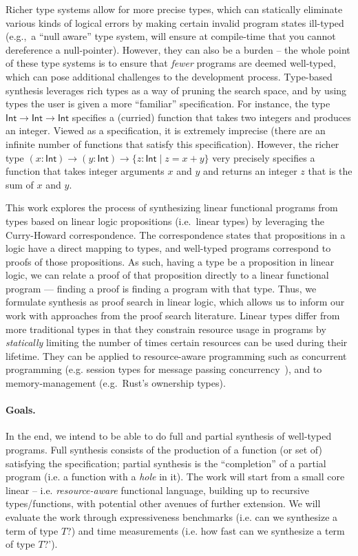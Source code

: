 \documentclass{llncs}
\newcommand{\mypara}[1]{\paragraph{\textbf{#1}.}}
\begin{document}
Richer type systems allow for more precise types, which can
statically eliminate various kinds of logical errors by making certain
invalid program states ill-typed (e.g.,~a ``null aware'' type system,
will ensure at compile-time that you cannot dereference a
null-pointer). However, they can also be a burden -- the whole point
of these type systems is to ensure that \emph{fewer} programs are
deemed well-typed, which can pose additional challenges to the
development process. Type-based synthesis leverages rich types as a
way of pruning the search space, and by using types the user 
is given a more ``familiar'' specification. For instance, the type
$\mathsf{Int} \rightarrow \mathsf{Int} \rightarrow \mathsf{Int}$
specifies a (curried) function that takes two integers and produces an
integer. Viewed as a specification, it is extremely imprecise (there
are an infinite number of functions that satisfy this specification).
However, the richer type $(x{:}\mathsf{Int}) \rightarrow
(y{:}\mathsf{Int}) \rightarrow \{z{:}\mathsf{Int} \mid z = x+y\}$
very precisely specifies a function that takes integer arguments $x$
and $y$ and returns an integer $z$ that is the sum of $x$ and $y$. 

%
This work explores the process of synthesizing linear functional
programs from types based on linear logic propositions (i.e.~linear
types) by leveraging the Curry-Howard correspondence.  The
correspondence states that propositions in a logic have a direct
mapping to types, and well-typed programs correspond to proofs of
those propositions.  As such, having a type be a proposition in linear
logic, we can relate a proof of that proposition directly to a linear
functional program — finding a proof is finding a program with that
type. Thus, we formulate synthesis as proof search in linear logic,
which allows us to inform our work with approaches from the proof
search literature.  Linear types differ from more traditional types in
that they constrain resource usage in programs by \emph{statically}
limiting the number of times certain resources can be used during
their lifetime.  They can be applied to resource-aware programming
such as concurrent programming (e.g. session types for message passing
concurrency~\cite{}), and to memory-management (e.g.~Rust's ownership
types).

\mypara{Goals}
In the end, we intend to be able to do full and partial synthesis of
well-typed programs. Full synthesis consists of the production of a
function (or set of) satisfying the specification; partial synthesis
is the ``completion'' of a partial program (i.e. a function with a
\emph{hole} in it). The work will start from a small core linear --
i.e. \emph{resource-aware} functional language, building up to
recursive types/functions, with potential other avenues of further
extension. 
%
We will evaluate the work through
expressiveness benchmarks (i.e. can we synthesize a term of type $T$?) and time
measurements (i.e. how fast can we synthesize a term of type $T$?').
\end{document}
